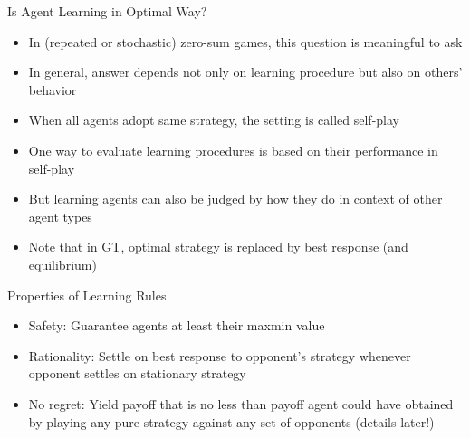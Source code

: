 \documentclass[11pt,aspectratio=169]{beamer}
\begin{document}
  
  \begin{frame}{Is Agent Learning in Optimal Way?}
   \begin{itemize}[<+->]\small
   \setlength{\itemsep}{0.7em}
    \item In (repeated or stochastic) zero-sum games, this question is meaningful to ask
    \item In general, answer depends not only on learning procedure but also on others' behavior
    \item When all agents adopt same strategy, the setting is called \alert{self-play}
    \item One way to evaluate learning procedures is based on their performance in self-play
    \item But learning agents can also be judged by how they do in context of other agent types
    \item Note that in GT, \alert{optimal strategy} is replaced by \alert{best response} (and equilibrium)
   \end{itemize}
  \end{frame}
  
  
  \begin{frame}{Properties of Learning Rules}
   \begin{itemize}[<+->]
   \setlength{\itemsep}{1.5em}
    \item \alert{Safety}: Guarantee agents at least their maxmin value
    \item \alert{Rationality}: Settle on best response to opponent's strategy whenever opponent settles on stationary strategy
    \item \alert{No regret}: Yield payoff that is no less than payoff agent could have obtained by playing any pure strategy against any set of opponents (details later!)
   \end{itemize}
  \end{frame}
  
\end{document}
